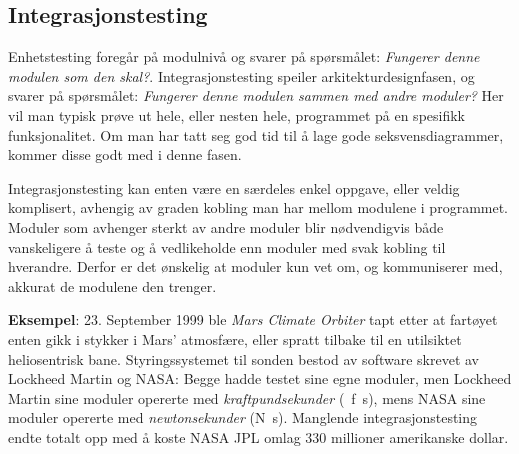 

\subsection{Integrasjonstesting}

Enhetstesting foregår på modulnivå og svarer på spørsmålet: \textit{Fungerer denne modulen som den skal?}. Integrasjonstesting speiler arkitekturdesignfasen, og svarer på spørsmålet: \textit{Fungerer denne modulen sammen med andre moduler?} Her vil man typisk prøve ut hele, eller nesten hele, programmet på en spesifikk funksjonalitet. Om man har tatt seg god tid til å lage gode seksvensdiagrammer, kommer disse godt med i denne fasen.

Integrasjonstesting kan enten være en særdeles enkel oppgave, eller veldig komplisert, avhengig av graden kobling man har mellom modulene i programmet. Moduler som avhenger sterkt av andre moduler blir nødvendigvis både vanskeligere å teste og å vedlikeholde enn moduler med svak kobling til hverandre. Derfor er det ønskelig at moduler kun vet om, og kommuniserer med, akkurat de modulene den trenger.

\textbf{Eksempel}: 23. September 1999 ble \textit{Mars Climate Orbiter} tapt etter at fartøyet enten gikk i stykker i Mars' atmosfære, eller spratt tilbake til en utilsiktet heliosentrisk bane. Styringssystemet til sonden bestod av software skrevet av Lockheed Martin og NASA: Begge hadde testet sine egne moduler, men Lockheed Martin sine moduler opererte med \textit{kraftpundsekunder} (\si{\pound f\s}), mens NASA sine moduler opererte med \textit{newtonsekunder} (\si{\N\s}). Manglende integrasjonstesting endte totalt opp med å koste NASA JPL omlag 330 millioner amerikanske dollar.


